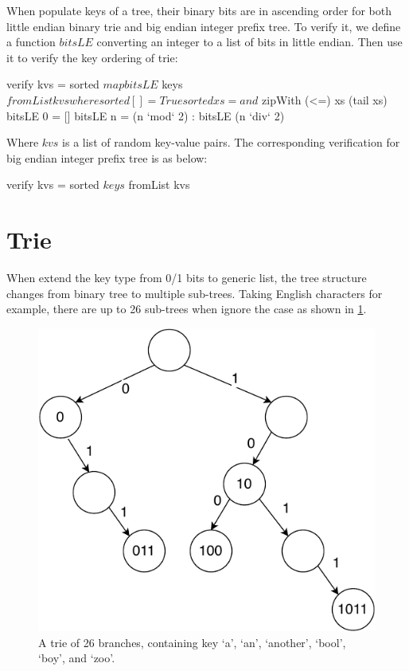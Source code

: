 \documentclass[b5paper]{article}
\begin{document}
\begin{Answer}[ref = {ex:int-tree-lookup}]
{When populate keys of a tree, their binary bits are in ascending order for both little endian binary trie and big endian integer prefix tree. To verify it, we define a function $bitsLE$ converting an integer to a list of bits in little endian. Then use it to verify the key ordering of trie:

\begin{Haskell}
verify kvs = sorted $ map bitsLE $ keys $ fromList kvs where
  sorted [] = True
  sorted xs = and $ zipWith (<=) xs (tail xs)
  bitsLE 0 = []
  bitsLE n = (n `mod` 2) : bitsLE (n `div` 2)
\end{Haskell}

Where $kvs$ is a list of random key-value pairs. The corresponding verification for big endian integer prefix tree is as below:

\begin{Haskell}
verify kvs = sorted $ keys $ fromList kvs
\end{Haskell}
}
\end{Answer}

\section{Trie}
When extend the key type from 0/1 bits to generic list, the tree structure changes from binary tree to multiple sub-trees. Taking English characters for example, there are up to 26 sub-trees when ignore the case as shown in \cref{fig:trie-of-26}.

\begin{figure}[htbp]
  \centering
  \includegraphics[scale=0.5, page=9]{img/trie}
  \caption{A trie of 26 branches, containing key `a', `an', `another', `bool', `boy', and `zoo'.}
  \label{fig:trie-of-26}
\end{figure}
\end{document}
